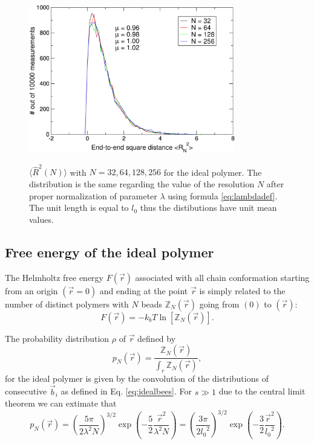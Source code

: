 \documentclass[12pt,a4paper,notitlepage]{article}
\begin{document}
\begin{figure}[h!]
\centering
\includegraphics[width=9cm]{RW_renorm}\\
\caption{$\langle \hat R^2(N) \rangle$ with $N = 32, 64, 128, 256$ for
  the ideal polymer. The distribution is the same  regarding the value
  of the resolution $N$ after proper normalization of parameter
  $\lambda$ using formula \ref{eq:lambdadef}. The unit length is equal
  to $l_0$ thus the distibutions have unit mean values.}
\label{fig:RWrenorm}
\end{figure}

\FloatBarrier
\subsection{Free energy of the ideal polymer}
The Helmholtz free energy $F(\vec r)$ associated with all chain
conformation starting from an origin $(\vec r = 0)$ and ending at the
point $\vec r$ is simply related to the number of distinct polymers
with $N$ beads $\mathbb{Z}_N(\vec r)$ going from $(0)$ to $(\vec r)$:
\begin{equation}
  F(\vec r) = - k_b T \ln \left[ \mathbb{Z}_N( \vec r ) \right].
\label{eq:entropy}
\end{equation}

The probability distribution $\rho$ of $\vec r$ defined by 
\begin{equation}
  p_N(\vec r) = \frac{\mathbb{Z}_N( \vec r )}
  { \int_r \mathbb{Z}_N( \vec r )},
\end{equation}
for the ideal polymer is given by the convolution of the distributions
of consecutive $\vec b_i$ as defined in Eq. \ref{eq:idealbees}.
For $s \gg 1$ due to the central limit theorem we can extimate that
\begin{equation}
  p_N \left( \vec r \right) =
  \left ( \frac{5 \pi}{2 \lambda^2 N} \right)^{3/2}  \exp \left(
    - \frac{5}{2} \frac{\vec r^2}{\lambda^2 N} \right) =
  \left ( \frac{3 \pi}{2 {l_0}^2} \right)^{3/2}  \exp \left(
    - \frac{3}{2} \frac{\vec r^2}{{l_0}^2} \right).
\label{eq:probideal}
\end{equation}
\end{document}
